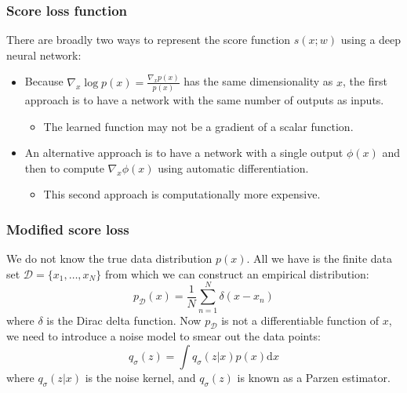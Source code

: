 \documentclass{beamer}
\begin{document}
\begin{frame}
    \frametitle{Score loss function}
    There are broadly two ways to represent the score function $s(x;w)$ using a deep neural network:
    \begin{itemize}
        \item Because $\nabla_{x}\log{}p(x)=\frac{\nabla_{x}p(x)}{p(x)}$ has the same dimensionality as $x$, the first approach is to have a network with the same number of outputs as inputs.
        \begin{itemize}
            \item The learned function may not be a gradient of a scalar function.
        \end{itemize}
        \item An alternative approach is to have a network with a single output $\phi(x)$ and then to compute $\nabla_{x}\phi(x)$ using automatic differentiation.
        \begin{itemize}
            \item This second approach is computationally more expensive.
        \end{itemize}
    \end{itemize}
\end{frame}

\begin{frame}
    \frametitle{Modified score loss}
    We do not know the true data distribution $p(x)$. All we have is the finite data set $\mathcal{D}=\{x_{1},\hdots,x_{N}\}$ from which we can construct an empirical distribution:
    \begin{equation*}
        p_{\mathcal{D}}(x)=\frac{1}{N}\sum_{n=1}^{N}\delta(x-x_{n})
    \end{equation*}
    where $\delta$ is the Dirac delta function. Now $p_{\mathcal{D}}$ is not a differentiable function of $x$, we need to introduce a noise model to smear out the data points:
    \begin{equation*}
        q_{\sigma}(z)=\int{}q_{\sigma}(z|x)p(x)\mathrm{d}x
    \end{equation*}
    where $q_{\sigma}(z|x)$ is the noise kernel, and $q_{\sigma}(z)$ is known as a Parzen estimator.
\end{frame}
\end{document}
